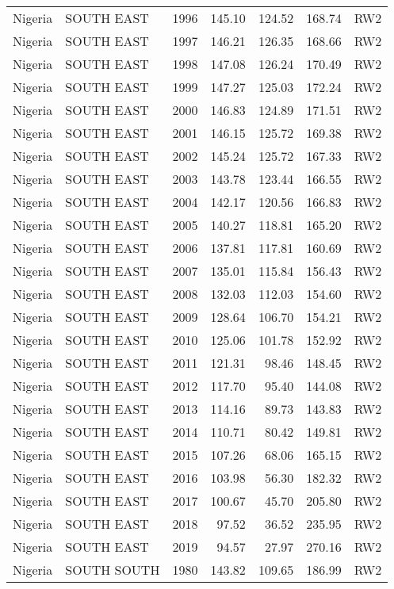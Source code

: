 \begin{longtable}{lllrrrl}
  Nigeria & SOUTH EAST & 1996 & 145.10 & 124.52 & 168.74 & RW2 \\ 
  Nigeria & SOUTH EAST & 1997 & 146.21 & 126.35 & 168.66 & RW2 \\ 
  Nigeria & SOUTH EAST & 1998 & 147.08 & 126.24 & 170.49 & RW2 \\ 
  Nigeria & SOUTH EAST & 1999 & 147.27 & 125.03 & 172.24 & RW2 \\ 
  Nigeria & SOUTH EAST & 2000 & 146.83 & 124.89 & 171.51 & RW2 \\ 
  Nigeria & SOUTH EAST & 2001 & 146.15 & 125.72 & 169.38 & RW2 \\ 
  Nigeria & SOUTH EAST & 2002 & 145.24 & 125.72 & 167.33 & RW2 \\ 
  Nigeria & SOUTH EAST & 2003 & 143.78 & 123.44 & 166.55 & RW2 \\ 
  Nigeria & SOUTH EAST & 2004 & 142.17 & 120.56 & 166.83 & RW2 \\ 
  Nigeria & SOUTH EAST & 2005 & 140.27 & 118.81 & 165.20 & RW2 \\ 
  Nigeria & SOUTH EAST & 2006 & 137.81 & 117.81 & 160.69 & RW2 \\ 
  Nigeria & SOUTH EAST & 2007 & 135.01 & 115.84 & 156.43 & RW2 \\ 
  Nigeria & SOUTH EAST & 2008 & 132.03 & 112.03 & 154.60 & RW2 \\ 
  Nigeria & SOUTH EAST & 2009 & 128.64 & 106.70 & 154.21 & RW2 \\ 
  Nigeria & SOUTH EAST & 2010 & 125.06 & 101.78 & 152.92 & RW2 \\ 
  Nigeria & SOUTH EAST & 2011 & 121.31 & 98.46 & 148.45 & RW2 \\ 
  Nigeria & SOUTH EAST & 2012 & 117.70 & 95.40 & 144.08 & RW2 \\ 
  Nigeria & SOUTH EAST & 2013 & 114.16 & 89.73 & 143.83 & RW2 \\ 
  Nigeria & SOUTH EAST & 2014 & 110.71 & 80.42 & 149.81 & RW2 \\ 
  Nigeria & SOUTH EAST & 2015 & 107.26 & 68.06 & 165.15 & RW2 \\ 
  Nigeria & SOUTH EAST & 2016 & 103.98 & 56.30 & 182.32 & RW2 \\ 
  Nigeria & SOUTH EAST & 2017 & 100.67 & 45.70 & 205.80 & RW2 \\ 
  Nigeria & SOUTH EAST & 2018 & 97.52 & 36.52 & 235.95 & RW2 \\ 
  Nigeria & SOUTH EAST & 2019 & 94.57 & 27.97 & 270.16 & RW2 \\ 
  Nigeria & SOUTH SOUTH & 1980 & 143.82 & 109.65 & 186.99 & RW2 \\ 

\end{longtable}
